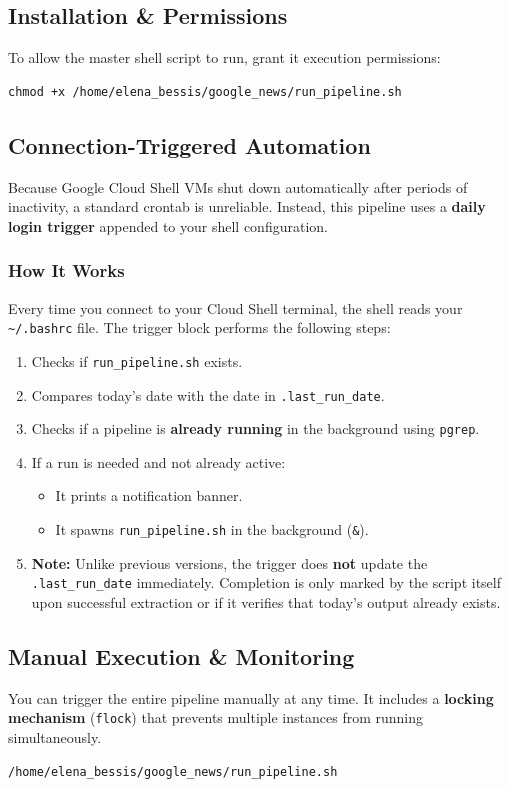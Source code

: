 \documentclass[11pt,a4paper]{article}
\begin{document}
\subsection{Installation \& Permissions}
To allow the master shell script to run, grant it execution permissions:
\begin{lstlisting}[style=bash]
chmod +x /home/elena_bessis/google_news/run_pipeline.sh
\end{lstlisting}

\subsection{Connection-Triggered Automation}
Because Google Cloud Shell VMs shut down automatically after periods of inactivity, a standard crontab is unreliable. Instead, this pipeline uses a \textbf{daily login trigger} appended to your shell configuration.

\subsubsection{How It Works}
Every time you connect to your Cloud Shell terminal, the shell reads your \verb|~/.bashrc| file. The trigger block performs the following steps:
\begin{enumerate}
    \item Checks if \verb|run_pipeline.sh| exists.
    \item Compares today's date with the date in \verb|.last_run_date|.
    \item Checks if a pipeline is \textbf{already running} in the background using \verb|pgrep|.
    \item If a run is needed and not already active:
    \begin{itemize}
        \item It prints a notification banner.
        \item It spawns \verb|run_pipeline.sh| in the background (\verb|&|).
    \end{itemize}
    \item \textbf{Note:} Unlike previous versions, the trigger does \textbf{not} update the \verb|.last_run_date| immediately. Completion is only marked by the script itself upon successful extraction or if it verifies that today's output already exists.
\end{enumerate}

\subsection{Manual Execution \& Monitoring}
You can trigger the entire pipeline manually at any time. It includes a \textbf{locking mechanism} (\verb|flock|) that prevents multiple instances from running simultaneously.
\begin{lstlisting}[style=bash]
/home/elena_bessis/google_news/run_pipeline.sh
\end{lstlisting}
\end{document}
